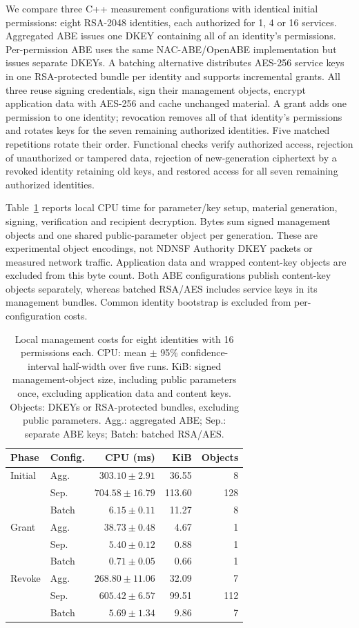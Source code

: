 We compare three C++ measurement configurations with identical initial permissions: eight RSA-2048 identities, each authorized for 1, 4 or 16 services. Aggregated ABE issues one DKEY containing all of an identity's permissions. Per-permission ABE uses the same NAC-ABE/OpenABE implementation but issues separate DKEYs. A batching alternative distributes AES-256 service keys in one RSA-protected bundle per identity and supports incremental grants. All three reuse signing credentials, sign their management objects, encrypt application data with AES-256 and cache unchanged material. A grant adds one permission to one identity; revocation removes all of that identity's permissions and rotates keys for the seven remaining authorized identities. Five matched repetitions rotate their order. Functional checks verify authorized access, rejection of unauthorized or tampered data, rejection of new-generation ciphertext by a revoked identity retaining old keys, and restored access for all seven remaining authorized identities.

Table~\ref{tab:permission-component-cost} reports local CPU time for parameter/key setup, material generation, signing, verification and recipient decryption. Bytes sum signed management objects and one shared public-parameter object per generation. These are experimental object encodings, not NDNSF Authority DKEY packets or measured network traffic. Application data and wrapped content-key objects are excluded from this byte count. Both ABE configurations publish content-key objects separately, whereas batched RSA/AES includes service keys in its management bundles. Common identity bootstrap is excluded from per-configuration costs.

\begin{table}[t]
\centering
\caption{Local management costs for eight identities with 16 permissions each. CPU: mean $\pm$ 95\% confidence-interval half-width over five runs. KiB: signed management-object size, including public parameters once, excluding application data and content keys. Objects: DKEYs or RSA-protected bundles, excluding public parameters. Agg.: aggregated ABE; Sep.: separate ABE keys; Batch: batched RSA/AES.}
\label{tab:permission-component-cost}
\footnotesize
\begin{tabular}{llrrr}
\toprule
Phase & Config. & CPU (ms) & KiB & Objects \\
\midrule
Initial & Agg. & $303.10\pm2.91$ & 36.55 & 8 \\
 & Sep. & $704.58\pm16.79$ & 113.60 & 128 \\
 & Batch & $6.15\pm0.11$ & 11.27 & 8 \\
Grant & Agg. & $38.73\pm0.48$ & 4.67 & 1 \\
 & Sep. & $5.40\pm0.12$ & 0.88 & 1 \\
 & Batch & $0.71\pm0.05$ & 0.66 & 1 \\
Revoke & Agg. & $268.80\pm11.06$ & 32.09 & 7 \\
 & Sep. & $605.42\pm6.57$ & 99.51 & 112 \\
 & Batch & $5.69\pm1.34$ & 9.86 & 7 \\
\bottomrule
\end{tabular}
\end{table}

